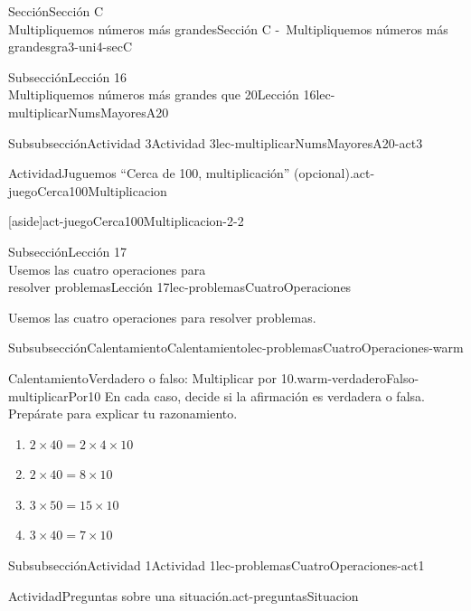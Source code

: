 \begin{sectionptx}{Sección}{{\Large Sección C\\}Multipliquemos números más grandes}{}{Sección C -~Multipliquemos números más grandes}{}{}{gra3-uni4-secC}
\begin{subsectionptx}{Subsección}{{\normalsize Lección 16\\[-0.05cm]}Multipliquemos números más grandes que 20}{}{Lección 16}{}{}{lec-multiplicarNumsMayoresA20}
\begin{subsubsectionptx}{Subsubsección}{Actividad 3}{}{Actividad 3}{}{}{lec-multiplicarNumsMayoresA20-act3}
\begin{activity}{Actividad}{Juguemos “Cerca de 100, multiplicación” (opcional).}{act-juegoCerca100Multiplicacion}
\begin{aside}{[aside]}{}{act-juegoCerca100Multiplicacion-2-2}
\end{aside}
\end{activity}%
%
\end{subsubsectionptx}
\end{subsectionptx}
%
%
\typeout{************************************************}
\typeout{************************************************}
%
\clearpage
\begin{subsectionptx}{Subsección}{{\normalsize Lección 17\\[-0.05cm]}Usemos las cuatro operaciones para\\resolver problemas}{}{Lección 17}{}{}{lec-problemasCuatroOperaciones}
\begin{introduction}{}%
Usemos las cuatro operaciones para resolver problemas.%
\end{introduction}%
%
%
\typeout{************************************************}
\typeout{************************************************}
%
\begin{subsubsectionptx}{Subsubsección}{Calentamiento}{}{Calentamiento}{}{}{lec-problemasCuatroOperaciones-warm}
\begin{exploration}{Calentamiento}{Verdadero o falso: Multiplicar por 10.}{warm-verdaderoFalso-multiplicarPor10}%
En cada caso, decide si la afirmación es verdadera o falsa. Prepárate para explicar tu razonamiento.%
%
\begin{enumerate}[label={\Alph*.}]
\item{}\(\displaystyle 2 \times 40 = 2 \times 4 \times 10\)%
\item{}\(\displaystyle 2 \times 40 = 8 \times 10\)%
\item{}\(\displaystyle 3 \times 50 = 15 \times 10\)%
\item{}\(\displaystyle 3 \times 40 = 7 \times 10\)%
\end{enumerate}
\end{exploration}%
\end{subsubsectionptx}
%
%
\typeout{************************************************}
\typeout{************************************************}
%
\begin{subsubsectionptx}{Subsubsección}{Actividad 1}{}{Actividad 1}{}{}{lec-problemasCuatroOperaciones-act1}
\begin{activity}{Actividad}{Preguntas sobre una situación.}{act-preguntasSituacion}%

\end{activity}
\end{subsubsectionptx}
\end{subsectionptx}
\end{sectionptx}
